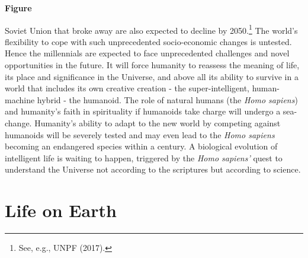 \begin{multicols}{2}
\begin{center}
{\bf Figure}
\end{center}

Soviet Union that broke away are also expected to decline by 2050.\footnote{See, e.g., UNPF (2017).} The world's flexibility to cope with such unprecedented socio-economic changes is untested. Hence the millennials are expected to face unprecedented challenges and novel opportunities in the future. It will force humanity to reassess the meaning of life, its place and significance in the Universe, and above all its ability to survive in a world that includes its own creative creation - the super-intelligent, human-machine hybrid - the humanoid. The role of natural humans (the \textit{Homo sapiens}) and humanity's faith in spirituality if humanoids take charge will undergo a sea-change. Humanity's ability to adapt to the new world by competing against humanoids will be severely tested and may even lead to the \textit{Homo sapiens} becoming an endangered species within a century. A biological evolution of intelligent life is waiting to happen, triggered by the \textit{Homo sapiens'} quest to understand the Universe not according to the scriptures but according to science.

\section{Life on Earth}


\end{multicols}

